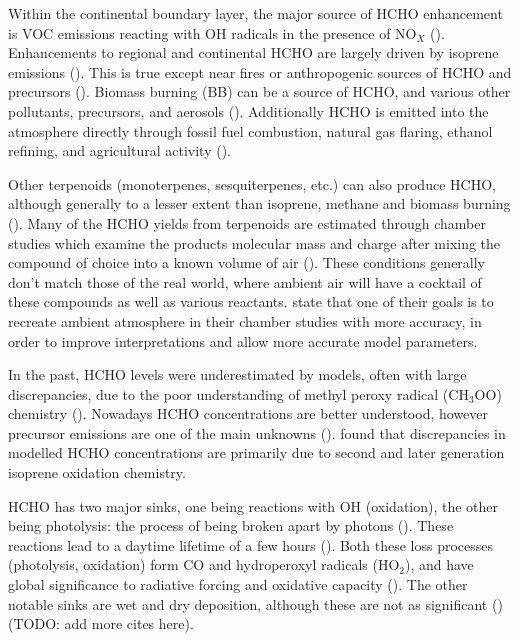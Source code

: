     Within the continental boundary layer, the major source of HCHO enhancement is VOC emissions reacting with OH radicals in the presence of NO$_X$ (\cite{Wagner2002, Millet2006, Kefauver2014}).
    Enhancements to regional and continental HCHO are largely driven by isoprene emissions (\cite{Guenther1995, Palmer2003, Shim2005, Kefauver2014}).
    This is true except near fires or anthropogenic sources of HCHO and precursors (\cite{Guenther1995, Kefauver2014, Wolfe2016}).
    Biomass burning (BB) can be a source of HCHO, and various other pollutants, precursors, and aerosols (\cite{Guenther1995, Andreae2001}).
    Additionally HCHO is emitted into the atmosphere directly through fossil fuel combustion, natural gas flaring, ethanol refining, and agricultural activity (\cite{Wolfe2016}).
    
    Other terpenoids (monoterpenes, sesquiterpenes, etc.) can also produce HCHO, although generally to a lesser extent than isoprene, methane and biomass burning (\cite{Guenther2012}).
    Many of the HCHO yields from terpenoids are estimated through chamber studies which examine the products molecular mass and charge after mixing the compound of choice into a known volume of air (\cite[eg.]{Nguyen2014}).
    These conditions generally don't match those of the real world, where ambient air will have a cocktail of these compounds as well as various reactants.
    \cite{Nguyen2014} state that one of their goals is to recreate ambient atmosphere in their chamber studies with more accuracy, in order to improve interpretations and allow more accurate model parameters.
    
    In the past, HCHO levels were underestimated by models, often with large discrepancies, due to the poor understanding of methyl peroxy radical (CH$_3$OO) chemistry (\cite{Wagner2002}).
    Nowadays HCHO concentrations are better understood, however precursor emissions are one of the main unknowns (\cite[eg.]{Emmerson2016,Marvin2017}).
    \cite{Marvin2017} found that discrepancies in modelled HCHO concentrations are primarily due to second and later generation isoprene oxidation chemistry.
    
    HCHO has two major sinks, one being reactions with OH (oxidation), the other being photolysis: the process of being broken apart by photons (\cite{Crutzen1999, Wagner2002, Levy1972, Kefauver2014}).
    These reactions lead to a daytime lifetime of a few hours (\cite{Atkinson2000, Millet2006}).
    Both these loss processes (photolysis, oxidation) form CO and hydroperoxyl radicals (HO$_2$), and have global significance to radiative forcing and oxidative capacity (\cite{Franco2015}).
    The other notable sinks are wet and dry deposition, although these are not as significant (\cite{Atkinson2000}) (TODO: add more cites here).
    
